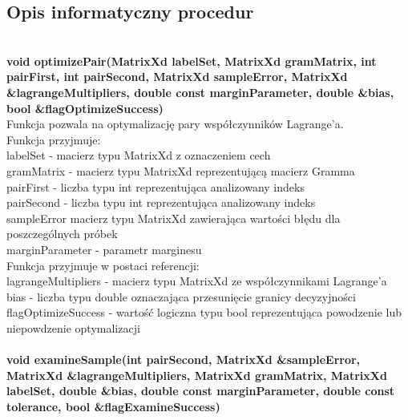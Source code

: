 \documentclass[[10pt,a4paper]{article}
\begin{document}
\subsection{Opis informatyczny procedur}


\\
\newline
\textbf {void optimizePair(MatrixXd labelSet, MatrixXd gramMatrix, int pairFirst, int pairSecond, MatrixXd sampleError, MatrixXd \&lagrangeMultipliers, double const marginParameter, double \&bias, bool \&flagOptimizeSuccess)}\\
\newline
\vspace{3mm}Funkcja pozwala na optymalizację pary współczynników Lagrange'a.\\
\vspace{3mm}Funkcja przyjmuje:\\
labelSet - macierz typu MatrixXd z oznaczeniem cech\\
gramMatrix - macierz typu MatrixXd reprezentującą macierz Gramma\\
pairFirst - liczba typu int reprezentująca analizowany indeks \\
pairSecond - liczba typu int reprezentująca analizowany indeks \\
sampleError macierz typu MatrixXd zawierająca wartości błędu dla poszczególnych próbek\\
marginParameter - parametr marginesu \\
\newline
\vspace{3mm}Funkcja przyjmuje w postaci referencji:\\
lagrangeMultipliers - macierz typu MatrixXd ze współczynnikami Lagrange'a\\
bias - liczba typu double oznaczająca przesunięcie granicy decyzyjności\\
flagOptimizeSuccess - wartość logiczna typu bool reprezentująca powodzenie lub niepowdzenie optymalizacji\\
\newline
\newline
\newline
{}\\
\newline
\textbf {void examineSample(int pairSecond, MatrixXd \&sampleError, MatrixXd \&lagrangeMultipliers, MatrixXd gramMatrix, MatrixXd labelSet, double \&bias, double const marginParameter, double const tolerance, bool \&flagExamineSuccess)}\\
\end{document}
